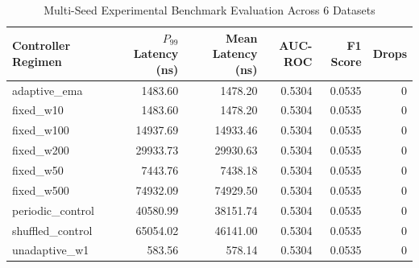 \begin{table}[h]
\centering
\caption{Multi-Seed Experimental Benchmark Evaluation Across 6 Datasets}
\begin{tabular}{lrrrrr}
\toprule
Controller Regimen & $P_{99}$ Latency (ns) & Mean Latency (ns) & AUC-ROC & F1 Score & Drops \\
\midrule
adaptive\_ema & 1483.60 & 1478.20 & 0.5304 & 0.0535 & 0 \\
fixed\_w10 & 1483.60 & 1478.20 & 0.5304 & 0.0535 & 0 \\
fixed\_w100 & 14937.69 & 14933.46 & 0.5304 & 0.0535 & 0 \\
fixed\_w200 & 29933.73 & 29930.63 & 0.5304 & 0.0535 & 0 \\
fixed\_w50 & 7443.76 & 7438.18 & 0.5304 & 0.0535 & 0 \\
fixed\_w500 & 74932.09 & 74929.50 & 0.5304 & 0.0535 & 0 \\
periodic\_control & 40580.99 & 38151.74 & 0.5304 & 0.0535 & 0 \\
shuffled\_control & 65054.02 & 46141.00 & 0.5304 & 0.0535 & 0 \\
unadaptive\_w1 & 583.56 & 578.14 & 0.5304 & 0.0535 & 0 \\
\bottomrule
\end{tabular}
\end{table}
